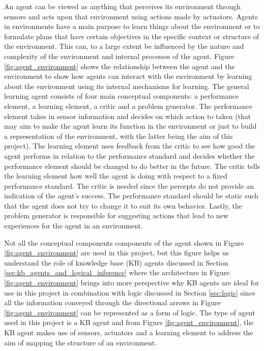 An agent can be viewed as anything that perceives its environment through sensors and acts upon that environment using actions made by actuators. Agents in environments have a main purpose to learn things about the environment or to formulate plans that have certain objectives in the specific context or structure of the environment. This can, to a large extent be influenced by the nature and complexity of the environment and internal processes of the agent. Figure \ref{fig:agent_environment} shows the relationship between the agent and the environment to show how agents can interact with the environment by learning about the environment using its internal mechanisms for learning. 
The general learning agent consists of four main conceptual components: a performance element, a learning element, a critic and a problem generator. The performance element takes in sensor information and decides on which action to taken (that may aim to make the agent learn its function in the environment or just to build a representation of the environment, with the latter being the aim of this project). The learning element uses feedback from the critic to see how good the agent performs in relation to the performance standard and decides whether the performance element should be changed to do better in the future. The critic tells the learning element how well the agent is doing with respect to a fixed performance standard. The critic is needed since the percepts do not provide an indication of the agent’s success. The performance standard should be static such that the agent does not try to change it to suit its own behavior. Lastly, the problem generator is responsible for suggesting actions that lead to new experiences for the agent in an environment. 

Not all the conceptual components components of the agent shown in Figure \ref{fig:agent_environment} are used in this project, but this figure helps us understand the role of knowledge base (KB) agents discussed in Section \ref{sec:kb_agents_and_logical_inference} where the architecture in Figure \ref{fig:agent_environment} brings into more perspective why KB agents are ideal for use in this project in combination with logic discussed in Section \ref{sec:logic} since all the information conveyed through the directional arrows in Figure \ref{fig:agent_environment} can be represented as a form of logic. The type of agent used in this project is a KB agent and from Figure \ref{fig:agent_environment}, the KB agent makes use of sensors, actuators and a learning element to address the aim of mapping the structure of an environment.

